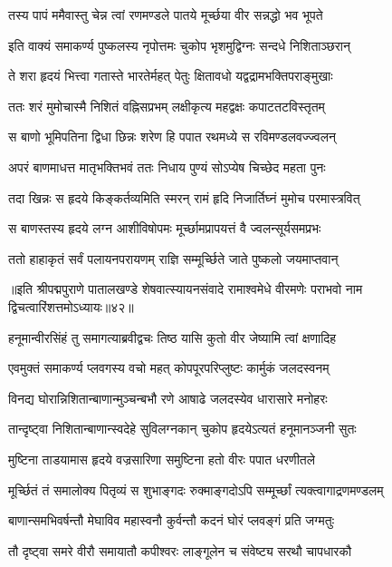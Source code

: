 \twolineshloka
{तस्य पापं ममैवास्तु चेन्न त्वां रणमण्डले}
{पातये मूर्च्छया वीर सन्नद्धो भव भूपते}%

\twolineshloka
{इति वाक्यं समाकर्ण्य पुष्कलस्य नृपोत्तमः}
{चुकोप भृशमुद्विग्नः सन्दधे निशिताञ्छरान्}%

\twolineshloka
{ते शरा हृदयं भित्त्वा गतास्ते भारतेर्महत्}
{पेतुः क्षितावधो यद्वद्रामभक्तिपराङ्मुखाः}%

\twolineshloka
{ततः शरं मुमोचास्मै निशितं वह्निसप्रभम्}
{लक्षीकृत्य महद्वक्षः कपाटतटविस्तृतम्}%

\twolineshloka
{स बाणो भूमिपतिना द्विधा छिन्नः शरेण हि}
{पपात रथमध्ये स रविमण्डलवज्ज्वलन्}%

\twolineshloka
{अपरं बाणमाधत्त मातृभक्तिभवं ततः}
{निधाय पुण्यं सोऽप्येष चिच्छेद महता पुनः}%

\twolineshloka
{तदा खिन्नः स हृदये किङ्कर्तव्यमिति स्मरन्}
{रामं हृदि निजार्तिघ्नं मुमोच परमास्त्रवित्}%

\twolineshloka
{स बाणस्तस्य हृदये लग्न आशीविषोपमः}
{मूर्च्छामप्रापयत्तं वै ज्वलन्सूर्यसमप्रभः}%

\twolineshloka
{ततो हाहाकृतं सर्वं पलायनपरायणम्}
{राज्ञि सम्मूर्च्छिते जाते पुष्कलो जयमाप्तवान्}%

{॥इति श्रीपद्मपुराणे पातालखण्डे शेषवात्स्यायनसंवादे रामाश्वमेधे वीरमणेः पराभवो नाम द्विचत्वारिंशत्तमोऽध्यायः॥४२॥}

\resetShloka


\twolineshloka
{हनूमान्वीरसिंहं तु समागत्याब्रवीद्वचः}
{तिष्ठ यासि कुतो वीर जेष्यामि त्वां क्षणादिह}%

\twolineshloka
{एवमुक्तं समाकर्ण्य प्लवगस्य वचो महत्}
{कोपपूरपरिप्लुष्टः कार्मुकं जलदस्वनम्}%

\twolineshloka
{विनद्य घोरान्निशितान्बाणान्मुञ्चन्बभौ रणे}
{आषाढे जलदस्येव धारासारे मनोहरः}%

\twolineshloka
{तान्दृष्ट्वा निशितान्बाणान्स्वदेहे सुविलग्नकान्}
{चुकोप हृदयेऽत्यतं हनूमानञ्जनी सुतः}%

\twolineshloka
{मुष्टिना ताडयामास हृदये वज्रसारिणा}
{समुष्टिना हतो वीरः पपात धरणीतले}%

\twolineshloka
{मूर्च्छितं तं समालोक्य पितृव्यं स शुभाङ्गदः}
{रुक्माङ्गदोऽपि सम्मूर्च्छां त्यक्त्वागाद्रणमण्डलम्}%

\twolineshloka
{बाणान्समभिवर्षन्तौ मेघाविव महास्वनौ}
{कुर्वन्तौ कदनं घोरं प्लवङ्गं प्रति जग्मतुः}%

\twolineshloka
{तौ दृष्ट्वा समरे वीरौ समायातौ कपीश्वरः}
{लाङ्गूलेन च संवेष्ट्य सरथौ चापधारकौ}%


